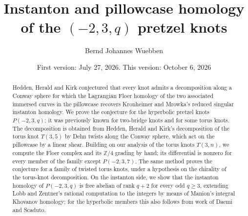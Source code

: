 \documentclass[11pt,reqno]{amsart}
\theoremstyle{plain}
\theoremstyle{definition}
\newcommand{\Z}{\mathbb{Z}}
\numberwithin{equation}{section}
\begin{document}
\title[Instanton and pillowcase homology of $(-2,3,q)$ pretzel knots]
{Instanton and pillowcase homology of the $(-2,3,q)$ pretzel knots}

\author{Bernd Johannes Wuebben}
\date{First version: July 27, 2026. This version: October 6, 2026}

\begin{abstract}
Hedden, Herald and Kirk conjectured that every knot admits a decomposition along a Conway sphere for which the
Lagrangian Floer homology of the two associated immersed curves in the pillowcase recovers Kronheimer and Mrowka's
reduced singular instanton homology. We prove the conjecture for the hyperbolic pretzel knots $P(-2,3,q)$; it was
previously known for two-bridge knots and for some torus knots. The decomposition is obtained from Hedden, Herald
and Kirk's decomposition of the torus knot $T(3,5)$ by Dehn twists along the Conway sphere, which act on the
pillowcase by a linear shear. Building on our analysis of the torus knots $T(3,n)$, we compute the Floer complex and its $\Z/4$ grading by hand; its differential is nonzero for every member
of the family except $P(-2,3,7)$. The same method proves the conjecture for a family of twisted torus knots, under a hypothesis on the chirality of the torus-knot decomposition. On the instanton side, we show that the
instanton homology of $P(-2,3,q)$ is free abelian of rank $q+2$ for every odd $q\ge3$, extending Lobb and Zentner's
rational computation to the integers by means of Manion's integral Khovanov homology; for the hyperbolic members
this also follows from work of Daemi and Scaduto.
\end{abstract}

\maketitle







\appendix

\end{document}
